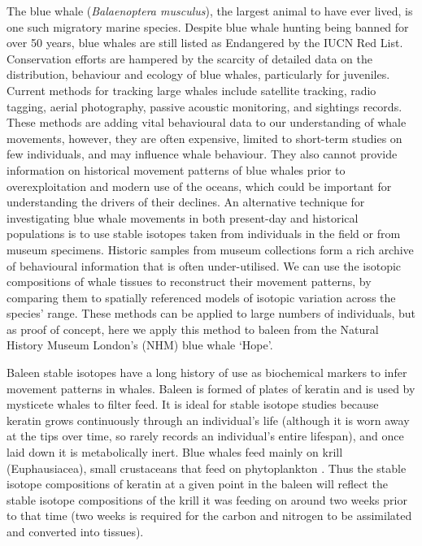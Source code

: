 \documentclass[a4paper,12pt]{article}
\begin{document}
The blue whale (\textit{Balaenoptera musculus}), the largest animal to have ever lived, is one such migratory marine species. 
Despite blue whale hunting being banned for over 50 years, blue whales are still listed as Endangered by the IUCN Red List\cite{reilly2008balaenoptera}.
Conservation efforts are hampered by the scarcity of detailed data on the distribution, behaviour and ecology of blue whales, particularly for juveniles. 
Current methods for tracking large whales include satellite tracking, radio tagging, aerial photography, passive acoustic monitoring, and sightings records\cite{borger15,mcdonald2006biogeographic,bailey2009behavioural,mate2007evolution,silva2013north}. 
These methods are adding vital behavioural data to our understanding of whale movements, however, they are often expensive, limited to short-term studies on few individuals\cite{bailey2009behavioural,best2015tag,mate2007evolution}, and may influence whale behaviour\cite{walker2012review}. 
They also cannot provide information on historical movement patterns of blue whales prior to overexploitation and modern use of the oceans, which could be important for understanding the drivers of their declines.
An alternative technique for investigating blue whale movements in both present-day and historical populations is to use stable isotopes taken from individuals in the field or from museum specimens\cite{west2006stable,busquets2017estimating,hobson2008tracking}. 
Historic samples from museum collections form a rich archive of behavioural information \cite{lister2011natural} that is often under-utilised.
We can use the isotopic compositions of whale tissues to reconstruct their movement patterns, by comparing them to spatially referenced models of isotopic variation across the species' range\cite{hobson1999tracing,hobson2008tracking,eisenmann2016isotopic}. 
These methods can be applied to large numbers of individuals, but as proof of concept, here we apply this method to baleen from the Natural History Museum London's (NHM) blue whale `Hope'.
 
Baleen stable isotopes have a long history of use as biochemical markers to infer movement patterns in whales\cite{ryan2013stable,best1996stable,hobson1998stable,hobson2008tracking}.
Baleen is formed of plates of keratin and is used by mysticete whales to filter feed. 
It is ideal for stable isotope studies because keratin grows continuously through an individual's life (although it is worn away at the tips over time, so rarely records an individual's entire lifespan), and once laid down it is metabolically inert\cite{best1996stable}. 
Blue whales feed mainly on krill (Euphausiacea), small crustaceans that feed on phytoplankton \cite{handbook}.
Thus the stable isotope compositions of keratin at a given point in the baleen will reflect the stable isotope compositions of the krill it was feeding on around two weeks prior to that time (two weeks is required for the carbon and nitrogen to be assimilated and converted into tissues). %
\end{document}
